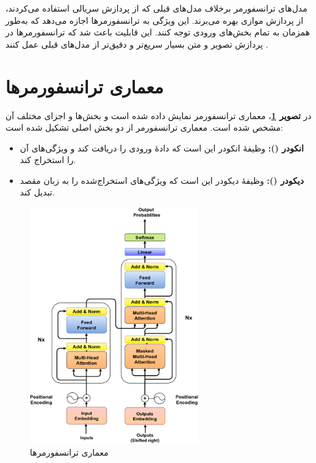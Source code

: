 مدل‌های ترانسفورمر برخلاف مدل‌های قبلی که از پردازش سریالی استفاده می‌کردند، از پردازش موازی بهره می‌برند. این ویژگی به ترانسفورمرها اجازه می‌دهد که به‌طور همزمان به تمام بخش‌های ورودی توجه کنند. این قابلیت باعث شد که ترانسفورمرها در پردازش تصویر و متن بسیار سریع‌تر و دقیق‌تر از مدل‌های قبلی عمل کنند \cite{vaswani2017attention}.

\section{معماری ترانسفورمرها}
در \textbf{تصویر \ref{fig:transformer_architecture}}، معماری ترانسفورمر نمایش داده شده است و بخش‌ها و اجزای مختلف آن مشخص شده است. معماری ترانسفورمر از دو بخش اصلی تشکیل شده است:
\begin{itemize}
	\item \textbf{انکودر ():}
	وظیفهٔ انکودر این است که دادهٔ ورودی را دریافت کند و ویژگی‌های آن را استخراج کند.
	\item \textbf{دیکودر ():}
	وظیفهٔ دیکودر این است که ویژگی‌های استخراج‌شده را به زبان مقصد تبدیل کند.
\end{itemize}

\begin{figure}[h]
	\centering
	\includegraphics[width=0.65\textwidth]{Transformer-model-architecture.png}
	\caption{معماری ترانسفورمرها}
	\label{fig:transformer_architecture}
\end{figure}

